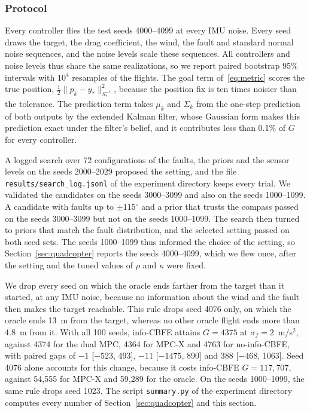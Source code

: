 \documentclass{l4dc2027}
\begin{document}
\subsubsection{Protocol}\label{supp:quad-protocol}

Every controller flies the test seeds 4000--4099 at every IMU noise. Every seed draws the target, the drag coefficient, the wind, the fault and standard normal noise sequences, and the noise levels scale these sequences. All controllers and noise levels thus share the same realizations, so we report paired bootstrap 95\% intervals with $10^4$ resamples of the flights. The goal term of~\eqref{eq:metric} scores the true position, $\tfrac{1}{2}\|p_k - y_*\|^2_{S_*^{-1}}$, because the position fix is ten times noisier than the tolerance. The prediction term takes $\mu_k$ and $\Sigma_k$ from the one-step prediction of both outputs by the extended Kalman filter, whose Gaussian form makes this prediction exact under the filter's belief, and it contributes less than 0.1\% of $G$ for every controller.

A logged search over 72 configurations of the faults, the priors and the sensor levels on the seeds 2000--2029 proposed the setting, and the file \texttt{results/search\_log.jsonl} of the experiment directory keeps every trial. We validated the candidates on the seeds 3000--3099 and also on the seeds 1000--1099. A candidate with faults up to $\pm 115^\circ$ and a prior that trusts the compass passed on the seeds 3000--3099 but not on the seeds 1000--1099. The search then turned to priors that match the fault distribution, and the selected setting passed on both seed sets. The seeds 1000--1099 thus informed the choice of the setting, so Section~\ref{sec:quadcopter} reports the seeds 4000--4099, which we flew once, after the setting and the tuned values of $\rho$ and $\kappa$ were fixed.

We drop every seed on which the oracle ends farther from the target than it started, at any IMU noise, because no information about the wind and the fault then makes the target reachable. This rule drops seed 4076 only, on which the oracle ends 13~m from the target, whereas no other oracle flight ends more than 4.8~m from it. With all 100 seeds, info-CBFE attains $G = 4375$ at $\sigma_f = 2$~m/s$^2$, against 4374 for the dual MPC, 4364 for MPC-X and 4763 for no-info-CBFE, with paired gaps of $-1$ [$-523$, 493], $-11$ [$-1475$, 890] and 388 [$-468$, 1063]. Seed 4076 alone accounts for this change, because it costs info-CBFE $G = 117{,}707$, against 54{,}555 for MPC-X and 59{,}289 for the oracle. On the seeds 1000--1099, the same rule drops seed 1023. The script \texttt{summary.py} of the experiment directory computes every number of Section~\ref{sec:quadcopter} and this section.
\end{document}
